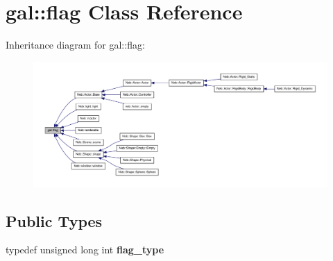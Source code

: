 \hypertarget{classgal_1_1flag}{\section{gal\-:\-:flag \-Class \-Reference}
\label{classgal_1_1flag}
}


\-Inheritance diagram for gal\-:\-:flag\-:\nopagebreak
\begin{figure}[H]
\begin{center}
\leavevmode
\includegraphics[width=350pt]{classgal_1_1flag__inherit__graph}
\end{center}
\end{figure}
\subsection*{\-Public \-Types}
\begin{DoxyCompactItemize}
\item 
\hypertarget{classgal_1_1flag_a29c4c2b58d78fb8bc8e5f366d8f79c13}{typedef unsigned long int {\bfseries flag\-\_\-type}}\label{classgal_1_1flag_a29c4c2b58d78fb8bc8e5f366d8f79c13}

\end{DoxyCompactItemize}
